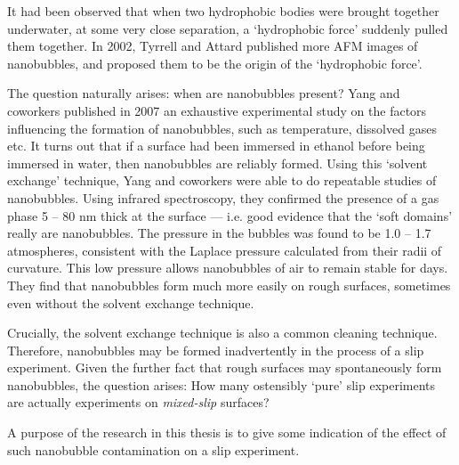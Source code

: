 \documentclass[a4paper]{report}
\begin{document}
It had been observed that when two hydrophobic bodies were brought together underwater, at some very close separation, a `hydrophobic force' suddenly pulled them together.  In 2002, Tyrrell and Attard published \cite{TyrrellAttard2002} more AFM images of nanobubbles, and proposed them to be the origin of the `hydrophobic force'.

\begin{center}
\end{center}

The question naturally arises: when are nanobubbles present?  Yang and coworkers published in 2007 \cite{Yang2007} an exhaustive experimental study on the factors influencing the formation of nanobubbles, such as temperature, dissolved gases etc.  It turns out that if a surface had been immersed in ethanol before being immersed in water, then nanobubbles are reliably formed.  Using this `solvent exchange' technique, Yang and coworkers were able to do repeatable studies of nanobubbles.  Using infrared spectroscopy, they confirmed the presence of a gas phase 5 -- 80 nm thick at the surface --- i.e. good evidence that the `soft domains' really are nanobubbles.  The pressure in the bubbles was found to be 1.0 -- 1.7 atmospheres, consistent with the Laplace pressure calculated from their radii of curvature.  This low pressure allows nanobubbles of air to remain stable for days.  They find that nanobubbles form much more easily on rough surfaces, sometimes even without the solvent exchange technique.

Crucially, the solvent exchange technique is also a common cleaning technique.  Therefore, nanobubbles may be formed inadvertently in the process of a slip experiment.  Given the further fact that rough surfaces may spontaneously form nanobubbles, the question arises:  How many ostensibly `pure' slip experiments are actually experiments on \emph{mixed-slip} surfaces?

A purpose of the research in this thesis is to give some indication of the effect of such nanobubble contamination on a slip experiment.
\end{document}
